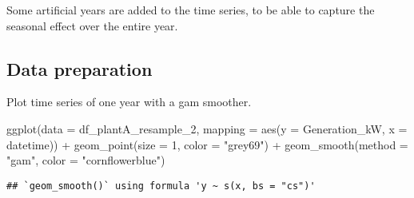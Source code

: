 \documentclass[
]{article}
\newenvironment{Shaded}{\begin{snugshade}}{\end{snugshade}}
\newcommand{\AttributeTok}[1]{\textcolor[rgb]{0.77,0.63,0.00}{#1}}
\newcommand{\DecValTok}[1]{\textcolor[rgb]{0.00,0.00,0.81}{#1}}
\newcommand{\FunctionTok}[1]{\textcolor[rgb]{0.00,0.00,0.00}{#1}}
\newcommand{\NormalTok}[1]{#1}
\newcommand{\OtherTok}[1]{\textcolor[rgb]{0.56,0.35,0.01}{#1}}
\newcommand{\SpecialCharTok}[1]{\textcolor[rgb]{0.00,0.00,0.00}{#1}}
\newcommand{\StringTok}[1]{\textcolor[rgb]{0.31,0.60,0.02}{#1}}
\begin{document}
Some artificial years are added to the time series, to be able to
capture the seasonal effect over the entire year.

\hypertarget{data-preparation-1}{%
\subsection{Data preparation}\label{data-preparation-1}}

\begin{Shaded}
\end{Shaded}

Plot time series of one year with a gam smoother.

\begin{Shaded}
\begin{Highlighting}[]
\FunctionTok{ggplot}\NormalTok{(}\AttributeTok{data =}\NormalTok{ df\_plantA\_resample\_2,}
  \AttributeTok{mapping =} \FunctionTok{aes}\NormalTok{(}\AttributeTok{y =}\NormalTok{ Generation\_kW, }\AttributeTok{x =}\NormalTok{ datetime)) }\SpecialCharTok{+}
  \FunctionTok{geom\_point}\NormalTok{(}\AttributeTok{size =} \DecValTok{1}\NormalTok{, }\AttributeTok{color =} \StringTok{"grey69"}\NormalTok{) }\SpecialCharTok{+}
  \FunctionTok{geom\_smooth}\NormalTok{(}\AttributeTok{method =} \StringTok{"gam"}\NormalTok{, }\AttributeTok{color =} \StringTok{"cornflowerblue"}\NormalTok{)}
\end{Highlighting}
\end{Shaded}

\begin{verbatim}
## `geom_smooth()` using formula 'y ~ s(x, bs = "cs")'
\end{verbatim}
\end{document}
